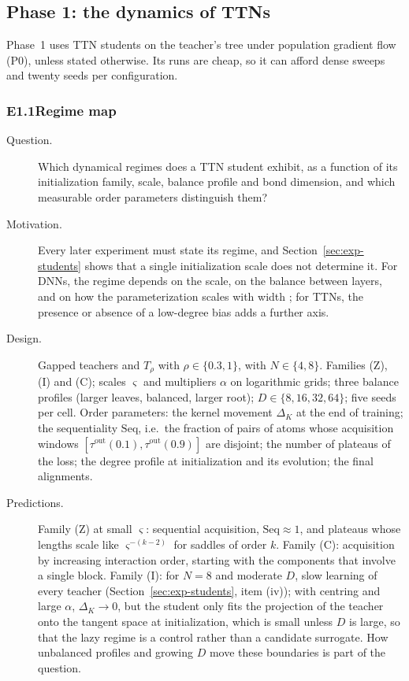 \documentclass[11pt]{article}
\theoremstyle{definition}
\numberwithin{equation}{section}
\begin{document}
\subsection{Phase 1: the dynamics of TTNs}\label{sec:exp-phase1}

Phase~1 uses TTN students on the teacher's tree under population gradient flow (P0), unless stated otherwise. Its runs are cheap, so it can afford dense sweeps and twenty seeds per configuration.

\subsubsection*{E1.1\quad Regime map}
\begin{description}
\item[Question.] Which dynamical regimes does a TTN student exhibit, as a function of its initialization family, scale, balance profile and bond dimension, and which measurable order parameters distinguish them?
\item[Motivation.] Every later experiment must state its regime, and Section~\ref{sec:exp-students} shows that a single initialization scale does not determine it. For DNNs, the regime depends on the scale, on the balance between layers, and on how the parameterization scales with width \citep{chizat2019lazy,woodworth2020kernel,yang2021tensor,kunin2024get}; for TTNs, the presence or absence of a low-degree bias adds a further axis.
\item[Design.] Gapped teachers and $T_\rho$ with $\rho\in\{0.3,1\}$, with $N\in\{4,8\}$. Families (Z), (I) and (C); scales $\varsigma$ and multipliers $\alpha$ on logarithmic grids; three balance profiles (larger leaves, balanced, larger root); $D\in\{8,16,32,64\}$; five seeds per cell. Order parameters: the kernel movement $\Delta_K$ at the end of training; the sequentiality $\mathrm{Seq}$, i.e.\ the fraction of pairs of atoms whose acquisition windows $[\tau^{\mathrm{out}}(0.1),\tau^{\mathrm{out}}(0.9)]$ are disjoint; the number of plateaus of the loss; the degree profile at initialization and its evolution; the final alignments.
\item[Predictions.] Family (Z) at small $\varsigma$: sequential acquisition, $\mathrm{Seq}\approx1$, and plateaus whose lengths scale like $\varsigma^{-(k-2)}$ for saddles of order $k$. Family (C): acquisition by increasing interaction order, starting with the components that involve a single block. Family (I): for $N=8$ and moderate $D$, slow learning of every teacher (Section~\ref{sec:exp-students}, item (iv)); with centring and large $\alpha$, $\Delta_K\to0$, but the student only fits the projection of the teacher onto the tangent space at initialization, which is small unless $D$ is large, so that the lazy regime is a control rather than a candidate surrogate. How unbalanced profiles and growing $D$ move these boundaries is part of the question.

\end{description}
\end{document}
